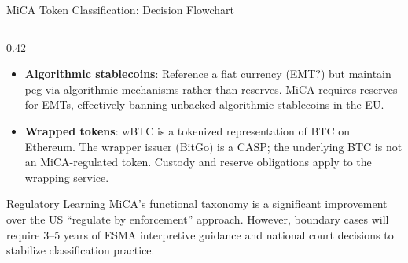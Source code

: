 \begin{frame}{MiCA Token Classification: Decision Flowchart}
\begin{columns}[T]
\begin{column}{0.42\textwidth}
\begin{itemize}
        \item \textbf{Algorithmic stablecoins}: Reference a fiat currency (EMT?) but maintain peg via algorithmic mechanisms rather than reserves. MiCA requires reserves for EMTs, effectively banning unbacked algorithmic stablecoins in the EU.
        \item \textbf{Wrapped tokens}: wBTC is a tokenized representation of BTC on Ethereum. The wrapper issuer (BitGo) is a CASP; the underlying BTC is not an MiCA-regulated token. Custody and reserve obligations apply to the wrapping service.
      \end{itemize}
      \vspace{0.2em}
      \begin{block}{Regulatory Learning}
        MiCA's functional taxonomy is a significant improvement over the US ``regulate by enforcement'' approach. However, boundary cases will require 3--5 years of ESMA interpretive guidance and national court decisions to stabilize classification practice.
      \end{block}
    \end{column}
  \end{columns}
\end{frame}


